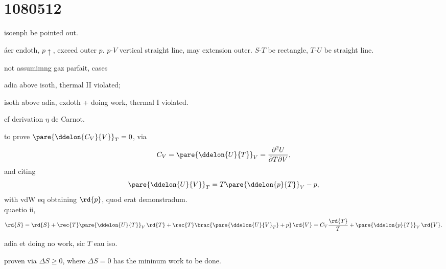 \documentclass{ctexart}
\begin{document}
\section{1080512} %
\label{sec:1080512}

\begin{ex}[7]
	isoenph be pointed out.
\end{ex}
\begin{ex}[II.1]
	\'aer endoth, $p\uparrow$, exceed outer $p$. $p$-$V$ vertical straight line, may extension outer. $S$-$T$ be rectangle, $T$-$U$ be straight line.
\end{ex}
\begin{ex}[II.2]
	not assumimng gaz parfait, cases
	\begin{cenum}
		\item adia above isoth, thermal II violated;
		\item isoth above adia, exdoth + doing work, thermal I violated.
	\end{cenum}
\end{ex}
\begin{ex}[II.3]
	cf derivation $\eta$ de Carnot.
\end{ex}
\begin{ex}[II.4]
	to prove $\pare{\ddelon{C_V}{V}}_T = 0$, via
	\[ C_V = \pare{\ddelon{U}{T}}_V = \frac{\partial^2 U}{\partial T\partial V}, \]
	and citing
	\[ \pare{\ddelon{U}{V}}_T = T\pare{\ddelon{p}{T}}_V - p, \]
	with vdW eq obtaining $\rd{p}$, quod erat demonstradum.
	\\
	quaetio ii,
	\[ \rd{S} = \rd{S} + \rec{T}\pare{\ddelon{U}{T}}_V\,\rd{T} + \rec{T}\brac{\pare{\ddelon{U}{V}_T} + p}\,\rd{V} = C_V\frac{\rd{T}}{T} + \pare{\ddelon{p}{T}}_V\,\rd{V}. \]
\end{ex}
\begin{ex}[II.5]
	adia et doing no work, sic $T$ eau iso.
\end{ex}
\begin{ex}[supp]
	proven via $\Delta S \ge 0$, where $\Delta S=0$ has the mininum work to be done.
\end{ex}

\end{document}
